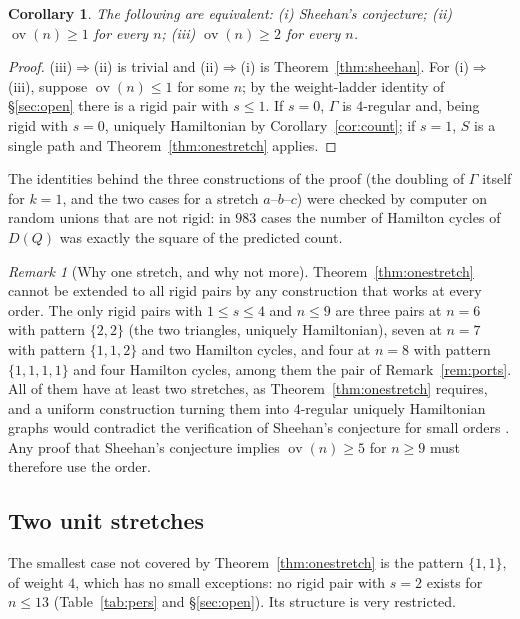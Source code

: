 \documentclass[11pt,a4paper]{article}
\newtheorem{corollary}[theorem]{Corollary}
\theoremstyle{definition}
\theoremstyle{remark}
\newtheorem{remark}[theorem]{Remark}
\newcommand{\ov}{\operatorname{ov}}
\begin{document}
\begin{corollary}\label{cor:ov2equiv}
The following are equivalent: (i) Sheehan's conjecture; (ii) $\ov(n)\ge1$ for every $n$; (iii) $\ov(n)\ge2$ for every $n$.
\end{corollary}

\begin{proof}
(iii)$\Rightarrow$(ii) is trivial and (ii)$\Rightarrow$(i) is Theorem~\ref{thm:sheehan}. For (i)$\Rightarrow$(iii), suppose $\ov(n)\le1$ for some $n$; by the weight-ladder identity of \S\ref{sec:open} there is a rigid pair with $s\le1$. If $s=0$, $\Gamma$ is $4$-regular and, being rigid with $s=0$, uniquely Hamiltonian by Corollary~\ref{cor:count}; if $s=1$, $S$ is a single path and Theorem~\ref{thm:onestretch} applies.
\end{proof}

The identities behind the three constructions of the proof (the doubling of $\Gamma$ itself for $k=1$, and the two cases for a stretch $a$--$b$--$c$) were checked by computer on random unions that are not rigid: in $983$ cases the number of Hamilton cycles of $D(Q)$ was exactly the square of the predicted count.

\begin{remark}[Why one stretch, and why not more]\label{rem:smallrigid}
Theorem~\ref{thm:onestretch} cannot be extended to all rigid pairs by any construction that works at every order. The only rigid pairs with $1\le s\le4$ and $n\le9$ are three pairs at $n=6$ with pattern $\{2,2\}$ (the two triangles, uniquely Hamiltonian), seven at $n=7$ with pattern $\{1,1,2\}$ and two Hamilton cycles, and four at $n=8$ with pattern $\{1,1,1,1\}$ and four Hamilton cycles, among them the pair of Remark~\ref{rem:ports}. All of them have at least two stretches, as Theorem~\ref{thm:onestretch} requires, and a uniform construction turning them into $4$-regular uniquely Hamiltonian graphs would contradict the verification of Sheehan's conjecture for small orders \cite{gmz20}. Any proof that Sheehan's conjecture implies $\ov(n)\ge5$ for $n\ge9$ must therefore use the order.
\end{remark}

\subsection{Two unit stretches}

The smallest case not covered by Theorem~\ref{thm:onestretch} is the pattern $\{1,1\}$, of weight $4$, which has no small exceptions: no rigid pair with $s=2$ exists for $n\le13$ (Table~\ref{tab:pers} and \S\ref{sec:open}). Its structure is very restricted.
\end{document}

